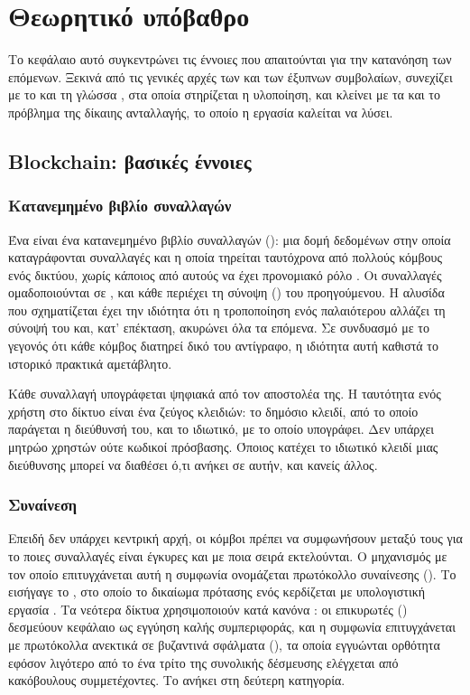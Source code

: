 \chapter{Θεωρητικό υπόβαθρο}
\label{ch:theoria}

Το κεφάλαιο αυτό συγκεντρώνει τις έννοιες που απαιτούνται για την κατανόηση των επόμενων.
Ξεκινά από τις γενικές αρχές των  και των έξυπνων συμβολαίων, συνεχίζει με
το  και τη γλώσσα , στα οποία στηρίζεται η υλοποίηση, και κλείνει με τα
 και το πρόβλημα της δίκαιης ανταλλαγής, το οποίο η εργασία καλείται να λύσει.

\section{Blockchain: βασικές έννοιες}
\label{sec:blockchain}

\subsection{Κατανεμημένο βιβλίο συναλλαγών}

Ένα  είναι ένα κατανεμημένο βιβλίο συναλλαγών (): μια δομή
δεδομένων στην οποία καταγράφονται συναλλαγές και η οποία τηρείται ταυτόχρονα από πολλούς
κόμβους ενός δικτύου, χωρίς κάποιος από αυτούς να έχει προνομιακό ρόλο
\cite{nakamoto2008}. Οι συναλλαγές ομαδοποιούνται σε , και κάθε 
περιέχει τη σύνοψη () του προηγούμενου. Η αλυσίδα που σχηματίζεται έχει την
ιδιότητα ότι η τροποποίηση ενός παλαιότερου  αλλάζει τη σύνοψή του και, κατ'
επέκταση, ακυρώνει όλα τα επόμενα. Σε συνδυασμό με το γεγονός ότι κάθε κόμβος διατηρεί
δικό του αντίγραφο, η ιδιότητα αυτή καθιστά το ιστορικό πρακτικά αμετάβλητο.

Κάθε συναλλαγή υπογράφεται ψηφιακά από τον αποστολέα της. Η ταυτότητα ενός χρήστη στο
δίκτυο είναι ένα ζεύγος κλειδιών: το δημόσιο κλειδί, από το οποίο παράγεται η διεύθυνσή
του, και το ιδιωτικό, με το οποίο υπογράφει. Δεν υπάρχει μητρώο χρηστών ούτε κωδικοί
πρόσβασης. Όποιος κατέχει το ιδιωτικό κλειδί μιας διεύθυνσης μπορεί να διαθέσει ό,τι
ανήκει σε αυτήν, και κανείς άλλος.

\subsection{Συναίνεση}

Επειδή δεν υπάρχει κεντρική αρχή, οι κόμβοι πρέπει να συμφωνήσουν μεταξύ τους για το ποιες
συναλλαγές είναι έγκυρες και με ποια σειρά εκτελούνται. Ο μηχανισμός με τον οποίο
επιτυγχάνεται αυτή η συμφωνία ονομάζεται πρωτόκολλο συναίνεσης (). Το
 εισήγαγε το , στο οποίο το δικαίωμα πρότασης ενός 
κερδίζεται με υπολογιστική εργασία \cite{nakamoto2008}. Τα νεότερα δίκτυα χρησιμοποιούν
κατά κανόνα : οι επικυρωτές () δεσμεύουν κεφάλαιο ως
εγγύηση καλής συμπεριφοράς, και η συμφωνία επιτυγχάνεται με πρωτόκολλα ανεκτικά σε
βυζαντινά σφάλματα (), τα οποία εγγυώνται ορθότητα εφόσον
λιγότερο από το ένα τρίτο της συνολικής δέσμευσης ελέγχεται από κακόβουλους συμμετέχοντες.
Το  ανήκει στη δεύτερη κατηγορία.

